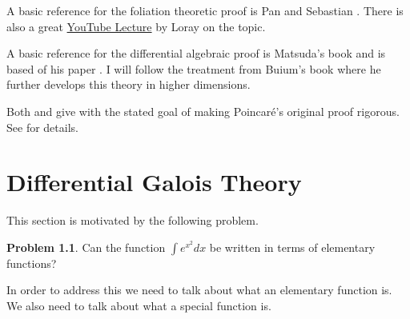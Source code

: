 \documentclass[12pt]{book}
\numberwithin{equation}{section}
\theoremstyle{definition}
\newtheorem{problem}[theorem]{Problem}
\theoremstyle{remark}
\begin{document}
A basic reference for the foliation theoretic proof is Pan and Sebastian \cite{Pan2004}.
There is also a great \href{https://www.youtube.com/watch?v=DoCCm8zjvXQ&list=PL0E0n75oNCDk5tuV-t2_K56sEfLd0Od8H&index=21}{YouTube Lecture} by Loray on the topic. 

A basic reference for the differential algebraic proof is Matsuda's book \cite{Matsuda1980} and is based of his paper \cite{Matsuda1978}.
I will follow the treatment from Buium's book \cite{Buium1986} where he further develops this theory in higher dimensions.

Both \cite{Pan2004} and \cite{Matsuda1978} give with the stated goal of making Poincar\'e's original proof rigorous. 
See \cite{Matsuda1978} for details.









\chapter[Differential Galois Theory]{Differential Galois Theory}

This section is motivated by the following problem.
\begin{problem}
	Can the function $\int e^{x^2} dx$ be written in terms of elementary functions?
\end{problem}
In order to address this we need to talk about what an elementary function is. 
We also need to talk about what a special function is. 
\end{document}
